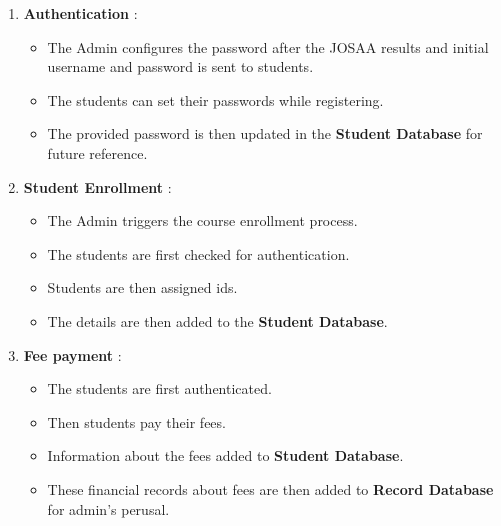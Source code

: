 \documentclass[12pt,a4paper]{article}
\begin{document}
\begin{enumerate}
	\item \textbf{Authentication} : 
		\begin{itemize}
			\item The Admin configures the password after the JOSAA results and initial username and password is sent to students.
			\item The students can set their passwords while registering.
			\item The provided password is then updated in the \textbf{Student Database} for future reference.
		\end{itemize}
	\item \textbf{Student Enrollment} :
		\begin{itemize}
			\item The Admin triggers the course enrollment process.
			\item The students are first checked for authentication.
			\item Students are then assigned ids.
			\item The details are then added to the \textbf{Student Database}.
		\end{itemize}
	\item \textbf{Fee payment} :
		\begin{itemize}
			\item The students are first authenticated.
			\item Then students pay their fees.
			\item Information about the fees added to \textbf{Student Database}.
			\item These financial records about fees are then added to \textbf{Record Database} for admin's perusal.
		\end{itemize}
	
\end{enumerate}
\end{document}
